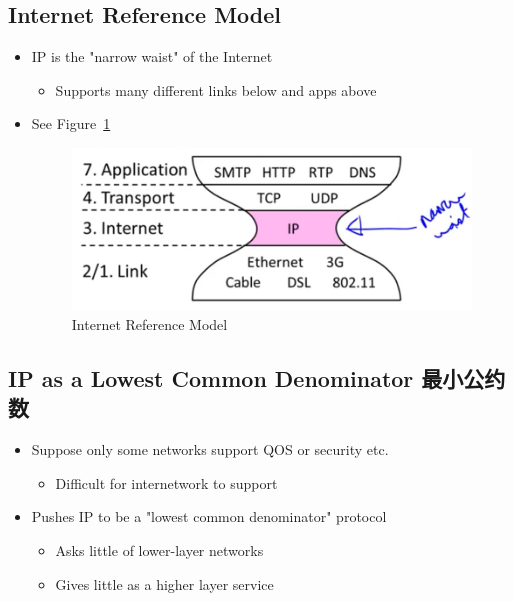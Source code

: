 \documentclass[12pt]{ctexart}   %
\begin{document}
	\subsection{Internet Reference Model}
	\begin{itemize}
		\item IP is the "narrow waist" of the Internet
		\begin{itemize}
			\item Supports many different links below and apps above
		\end{itemize}
		\item See Figure~\ref{fig:4-3-2}
		
		\begin{figure}[h!] %
		\centering
		 \includegraphics[scale=0.7]{images/4-3-2}
		\caption{ Internet Reference Model }
		 \label{fig:4-3-2}
		 \end{figure}
	\end{itemize}
	
	\subsection{IP as a Lowest Common Denominator 最小公约数}
	\begin{itemize}
		\item Suppose only some networks  support QOS or security etc.
		\begin{itemize}
			\item Difficult for internetwork to support
		\end{itemize}
		
		\item Pushes IP to be a "lowest common denominator" protocol
		\begin{itemize}
			\item Asks little of lower-layer networks
			\item Gives little as a higher layer service
		\end{itemize}
	\end{itemize}
	
\end{document}
